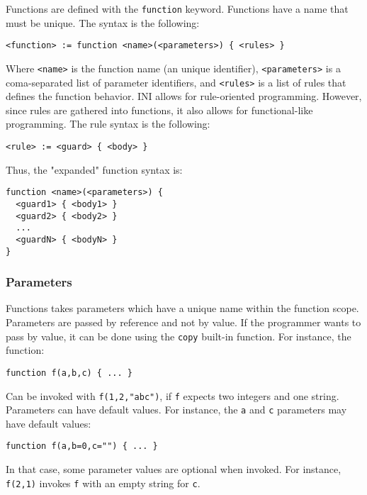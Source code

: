 \documentclass[11pt]{article}
\begin{document}
Functions are defined with the \texttt{function} keyword. Functions have a name that must be unique. The syntax is the following:

\begin{verbatim}
<function> := function <name>(<parameters>) { <rules> }
\end{verbatim}

Where \texttt{<name>} is the function name (an unique identifier), \texttt{<parameters>} is a coma-separated list of parameter identifiers, and \texttt{<rules>} is a list of rules that defines the function behavior. INI allows for rule-oriented programming. However, since rules are gathered into functions, it also allows for functional-like programming. The rule syntax is the following:

\begin{verbatim}
<rule> := <guard> { <body> }
\end{verbatim}

Thus, the "expanded" function syntax is:

\begin{verbatim}
function <name>(<parameters>) {
  <guard1> { <body1> }
  <guard2> { <body2> }
  ...
  <guardN> { <bodyN> }
}
\end{verbatim}

\subsubsection{Parameters}

Functions takes parameters which have a unique name within the function scope. Parameters are passed by reference and not by value. If the programmer wants to pass by value, it can be done using the \texttt{copy} built-in function. For instance, the function:

\begin{verbatim}
function f(a,b,c) { ... }
\end{verbatim}

Can be invoked with \texttt{f(1,2,"abc")}, if \texttt{f} expects two integers and one string. Parameters can have default values. For instance, the \texttt{a} and \texttt{c} parameters may have default values:

\begin{verbatim}
function f(a,b=0,c="") { ... }
\end{verbatim}

In that case, some parameter values are optional when invoked. For instance, \texttt{f(2,1)} invokes \texttt{f} with an empty string for \texttt{c}.
\end{document}
